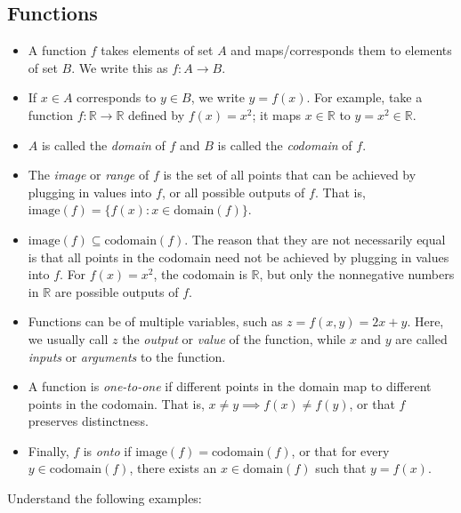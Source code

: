 \documentclass[11pt]{article}
\newcommand{\R}{\ensuremath{\mathbb R}}
\theoremstyle{plain}
\theoremstyle{definition}
\theoremstyle{remark}
\begin{document}
\subsection*{Functions}

\begin{itemize}
    \item A function $f$ takes elements of set $A$ and maps/corresponds them to elements of set $B$. We write this as $f: A \rightarrow B$.
    \item If $x \in A$ corresponds to $y \in B$, we write $y = f(x)$. For example, take a function $f: \R \rightarrow \R$ defined by $f(x) = x^2$; it maps $x \in \R$ to $y = x^2 \in \R$.
    \item $A$ is called the {\it domain} of $f$ and $B$ is called the {\it codomain} of $f$.
    \item The {\it image} or {\it range} of $f$ is the set of all points that can be achieved by plugging in values into $f$, or all possible outputs of $f$. That is, $\text{image}(f) = \{f(x) : x \in \text{domain}(f)\}$.
    \item $\text{image}(f) \subseteq \text{codomain}(f)$. The reason that they are not necessarily equal is that all points in the codomain need not be achieved by plugging in values into $f$. For $f(x) = x^2$, the codomain is $\R$, but only the nonnegative numbers in $\R$ are possible outputs of $f$.
    \item Functions can be of multiple variables, such as $z = f(x,y) = 2x + y$. Here, we usually call $z$ the {\it output} or {\it value} of the function, while $x$ and $y$ are called {\it inputs} or {\it arguments} to the function.
    \item A function is {\it one-to-one} if different points in the domain map to different points in the codomain. That is, $x \neq y \implies f(x) \neq f(y)$, or that $f$ preserves distinctness.
    \item Finally, $f$ is {\it onto} if $\text{image}(f) = \text{codomain}(f)$, or that for every $y \in \text{codomain}(f)$, there exists an $x \in \text{domain}(f)$ such that $y = f(x)$.
\end{itemize}
\newpage
Understand the following examples:
\end{document}
